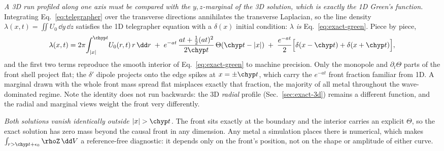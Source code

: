 \emph{A 3D run profiled along one axis must be compared with the
$y,z$-marginal of the 3D solution, which is exactly the 1D Green's
function.} Integrating Eq.~\eqref{eq:telegrapher} over the transverse
directions annihilates the transverse Laplacian, so the line density
$\lambda(x,t)=\iint U_0\,\dd y\,\dd z$ satisfies the 1D telegrapher
equation with a $\delta(x)$ initial condition: $\lambda$ \emph{is}
Eq.~\eqref{eq:exact-green}. Piece by piece,
\begin{equation}
  \label{eq:marginal-3d}
  \lambda(x,t) = 2\pi\!\int_{|x|}^{\chyp t}\! U_0(r,t)\,r\,\dd r
  \;+\; e^{-at}\,\frac{at+\tfrac12(at)^2}{2\chyp t}\,\Theta(\chyp t-|x|)
  \;+\; \frac{e^{-at}}{2}\Big[\delta(x-\chyp t)+\delta(x+\chyp t)\Big] ,
\end{equation}
and the first two terms reproduce the smooth interior of
Eq.~\eqref{eq:exact-green} to machine precision. Only the monopole and
$\partial_t\Theta$ parts of the front shell project flat; the $\delta'$
dipole projects onto the edge spikes at $x=\pm\chyp t$, which carry the
$e^{-at}$ front fraction familiar from 1D. A marginal drawn with the
whole front mass spread flat misplaces exactly that fraction, the
majority of all metal throughout the wave-dominated regime.
Note the identity does not run backwards: the 3D \emph{radial} profile
(Sec.~\ref{sec:exact-3d}) remains a different function, and the radial
and marginal views weight the front very differently.

\emph{Both solutions vanish identically outside $|x|>\chyp t$.} The front
sits exactly at the boundary and the interior carries an explicit
$\Theta$, so the exact solution has zero mass beyond the causal front in
any dimension. Any metal a simulation places there is numerical, which
makes $\int_{r>\chyp t+\epsilon_0}\rhoZ\,\dd V$ a reference-free
diagnostic: it depends only on the front's position, not on the shape or
amplitude of either curve.

